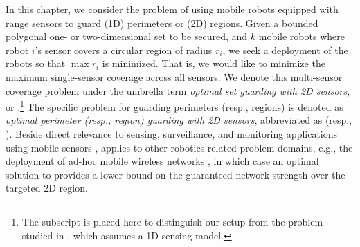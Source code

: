 In this chapter, we consider the problem of using mobile robots equipped 
with range sensors to guard (1D) perimeters or (2D) regions. Given 
a bounded polygonal one- or two-dimensional set to be secured, 
and $k$ mobile robots where robot $i$'s sensor covers a circular region of 
radius $r_i$, we seek a deployment of the robots so that $\max r_i$ is 
minimized. That is, we would like to minimize the maximum single-sensor 
coverage across all sensors. We denote this multi-sensor coverage problem 
under the umbrella term {\em optimal set guarding with 2D sensors}, or 
\osgt.\footnote{The subscript is placed here to distinguish our setup 
from the \opg problem studied in \cite{fenghangaoyu2019efficient}, which assumes 
a 1D sensing model.} The specific problem for guarding
perimeters (resp., regions) is denoted as {\em optimal perimeter 
(resp., region) guarding with 2D sensors}, abbreviated as \opgt (resp., 
\orgt). Beside direct relevance to sensing, surveillance, and monitoring 
applications using mobile sensors \cite{batalin2002spreading,
cortes2004coverage,fenghangaoyu2019efficient}, \osgt applies to other robotics
related problem domains, e.g., the deployment of ad-hoc mobile wireless 
networks \cite{correll2009ad,gil2012communication}, in which case an 
optimal solution to \osgt provides a lower bound on the guaranteed network 
strength over the targeted 2D region. 

